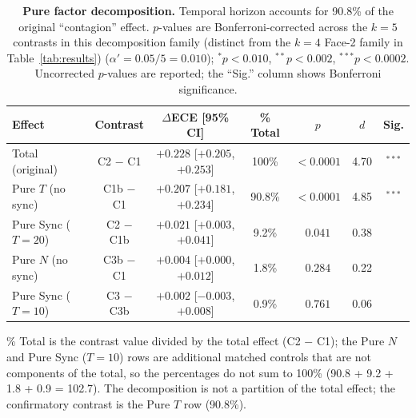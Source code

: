 \documentclass[11pt]{article}
\begin{document}
\begin{table}[H]
\centering
\caption{\textbf{Pure factor decomposition.} Temporal horizon accounts for 90.8\% of the original ``contagion'' effect. $p$-values are Bonferroni-corrected across the $k{=}5$ contrasts in this decomposition family (distinct from the $k{=}4$ Face-2 family in Table~\ref{tab:results}) ($\alpha' = 0.05/5 = 0.010$); $^{*}p<0.010$, $^{**}p<0.002$, $^{***}p<0.0002$. Uncorrected $p$-values are reported; the ``Sig.'' column shows Bonferroni significance.}
\label{tab:decomp}
\begin{tabular}{@{}lcccccc@{}}
\toprule
Effect & Contrast & $\Delta$ECE [95\% CI] & \% Total & $p$ & $d$ & Sig. \\
\midrule
Total (original) & C2 $-$ C1 & $+0.228$ [$+0.205$, $+0.253$] & 100\% & $<0.0001$ & 4.70 & $^{***}$ \\
Pure $T$ (no sync) & C1b $-$ C1 & $+0.207$ [$+0.181$, $+0.234$] & 90.8\% & $<0.0001$ & 4.85 & $^{***}$ \\
Pure Sync ($T{=}20$) & C2 $-$ C1b & $+0.021$ [$+0.003$, $+0.041$] & 9.2\% & $0.041$ & 0.38 & \\
Pure $N$ (no sync) & C3b $-$ C1 & $+0.004$ [$+0.000$, $+0.012$] & 1.8\% & $0.284$ & 0.22 & \\
Pure Sync ($T{=}10$) & C3 $-$ C3b & $+0.002$ [$-0.003$, $+0.008$] & 0.9\% & $0.761$ & 0.06 & \\
\bottomrule
\end{tabular}
\smallskip
{\footnotesize \% Total is the contrast value divided by the total effect (C2 $-$ C1); the Pure $N$ and Pure Sync ($T{=}10$) rows are additional matched controls that are not components of the total, so the percentages do not sum to 100\% (90.8 + 9.2 + 1.8 + 0.9 = 102.7). The decomposition is not a partition of the total effect; the confirmatory contrast is the Pure $T$ row (90.8\%).}
\end{table}
\end{document}
